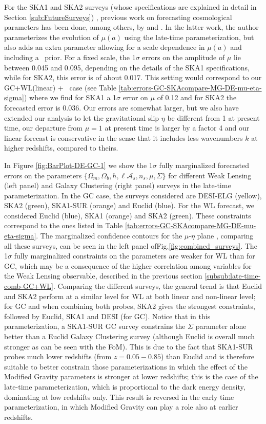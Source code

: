 For the SKA1 and SKA2 surveys (whose specifications are explained in detail in Section \ref{sub:FutureSurveys}) , 
previous work on forecasting cosmological parameters has been done, among others, by \cite{baker_observational_2015} and \cite{bull_extending_2015}. 
In the latter work, the author parameterizes the evolution of $\mu(a)$ using the late-time parameterization, but also adds an extra parameter
allowing for a scale dependence in $\mu(a)$ and including a \planck\ prior. For a fixed scale,
the 1$\sigma$ errors on the amplitude of $\mu$ lie between 0.045 and 0.095, depending on the details of the SKA1 specifications, while  
for SKA2, this error is of about 0.017. This setting would correspond to our GC+WL(linear) + \planck\ case 
(see Table \ref{tab:errors-GC-SKAcompare-MG-DE-mu-eta-sigma}) where we find for SKA1 a 1$\sigma$ error on $\mu$ of 0.12 and for SKA2 the forecasted error is 0.036.
Our errors are somewhat larger, but we also have extended our analysis to let the gravitational slip $\eta$ be different from 1 at present time, our departure from $\mu=1$ at present time is larger by a factor 4 and 
our linear forecast is conservative in the sense that it includes less wavenumbers $k$ at higher redshifts, compared to theirs.


In Figure \ref{fig:BarPlot-DE-GC-1} we show the 1$\sigma$ fully
marginalized forecasted errors on the parameters 
$\{\Omega_{m},\Omega_{b},h,\ell \mathcal{A}_{s},n_{s},\mu,\Sigma\}$
for different Weak Lensing (left panel) and Galaxy Clustering (right panel)
surveys in the late-time parameterization. In the GC case, the surveys
considered are DESI-ELG (yellow), SKA2 (green), SKA1-SUR (orange)
and Euclid (blue). For the WL forecast, we considered Euclid (blue),
SKA1 (orange) and SKA2 (green). These constraints correspond to the ones
listed in Table \ref{tab:errors-GC-SKAcompare-MG-DE-mu-eta-sigma}. 
The marginalized confidence contours for the $\mu$-$\eta$ plane , 
comparing all these surveys, can be seen in the left panel ofFig.\ref{fig:combined_surveys}.
The 1$\sigma$ fully marginalized
constraints on the parameters are weaker for WL than for GC,
which may be a consequence of the higher correlation among variables
for the Weak Lensing observable, described in the previous section \ref{subsub:late-time-comb-GC+WL}.
Comparing the different surveys,
the general trend is that Euclid and SKA2 perform at a similar level for WL at both linear and non-linear level; for GC and when combining both probes, SKA2
gives the strongest constraints, followed by Euclid, SKA1 and DESI (for GC).
Notice that in this parameterization, a SKA1-SUR GC survey constrains
the $\Sigma$ parameter alone better than a Euclid Galaxy Clustering
survey (although Euclid is overall much stronger as can be seen with the FoM). This is due to the fact that SKA1-SUR probes much lower
redshifts (from $z=0.05-0.85$) than Euclid and is therefore suitable to better constrain those parameterizations in which the effect of the Modified Gravity parameters is stronger at lower redshifts; this is the case of the late-time parameterization, which is proportional
to the dark energy density, dominating at low redshifts only. This result is reversed in the early time parameterization, in which Modified Gravity can play a role also at earlier redshifts. 



